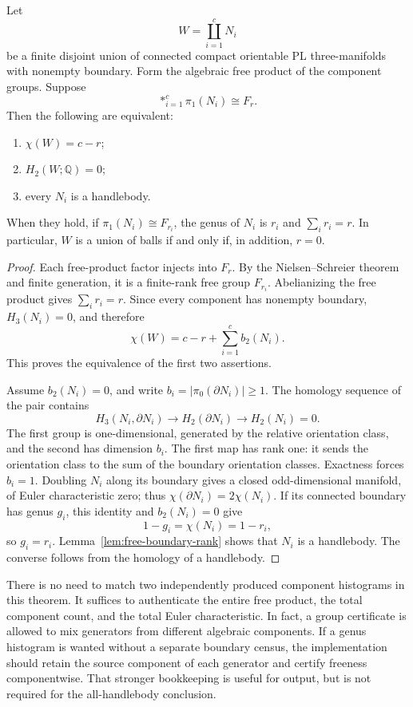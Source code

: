 \begin{theorem}
\label{thm:free-euler}
Let
\[
 W=\coprod_{i=1}^{c}N_i
\]
be a finite disjoint union of connected compact orientable PL
three-manifolds with nonempty boundary.  Form the algebraic free product
of the component groups.  Suppose
\[
 *_{i=1}^c\pi_1(N_i)\cong F_r.
\]
Then the following are equivalent:
\begin{enumerate}
\item $\chi(W)=c-r$;
\item $H_2(W;\mathbb Q)=0$;
\item every $N_i$ is a handlebody.
\end{enumerate}
When they hold, if $\pi_1(N_i)\cong F_{r_i}$, the genus of $N_i$ is
$r_i$ and $\sum_i r_i=r$.  In particular, $W$ is a union of balls if and
only if, in addition, $r=0$.
\end{theorem}
\begin{proof}
Each free-product factor injects into $F_r$.  By the Nielsen--Schreier
theorem and finite generation, it is a finite-rank free group $F_{r_i}$.
Abelianizing the free product gives $\sum_i r_i=r$.  Since every component
has nonempty boundary, $H_3(N_i)=0$, and therefore
\begin{equation}
 \chi(W)=c-r+\sum_{i=1}^c b_2(N_i).
 \label{eq:aggregate-beta-two}
\end{equation}
This proves the equivalence of the first two assertions.

Assume $b_2(N_i)=0$, and write $b_i=|\pi_0(\partial N_i)|\geq1$.
The homology sequence of the pair contains
\[
 H_3(N_i,\partial N_i)\longrightarrow H_2(\partial N_i)
       \longrightarrow H_2(N_i)=0.
\]
The first group is one-dimensional, generated by the relative orientation
class, and the second has dimension $b_i$.  The first map has rank one:
it sends the orientation class to the sum of the boundary orientation
classes.  Exactness forces $b_i=1$.  Doubling $N_i$ along its boundary
gives a closed odd-dimensional manifold, of Euler characteristic zero;
thus $\chi(\partial N_i)=2\chi(N_i)$.  If its connected boundary has
genus $g_i$, this identity and $b_2(N_i)=0$ give
\[
 1-g_i=\chi(N_i)=1-r_i,
\]
so $g_i=r_i$.  Lemma~\ref{lem:free-boundary-rank} shows that $N_i$ is a
handlebody.  The converse follows from the homology of a handlebody.
\end{proof}

There is no need to match two independently produced component
histograms in this theorem.  It suffices to authenticate the entire
free product, the total component count, and the total Euler
characteristic.  In fact, a group certificate is allowed to mix
generators from different algebraic components.  If a genus histogram is
wanted without a separate boundary census, the implementation should
retain the source component of each generator and certify freeness
componentwise.  That stronger bookkeeping is useful for output, but is
not required for the all-handlebody conclusion.

